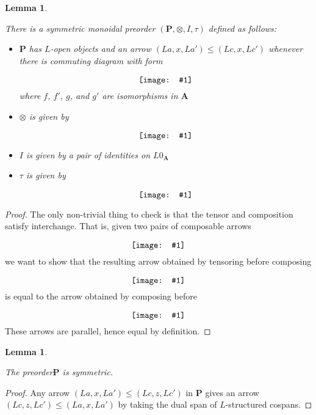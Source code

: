 \documentclass{amsart}
\newcommand{\A}{\cat{A}}
\renewcommand{\P}{\cat{P}}
\newcommand{\cat}[1]{\mathbf{#1}}
\newcommand{\diagram}[1]{\raisebox{-0.5\height}{\texttt{[image: \#1]}}}
\newtheorem{lemma}[theorem]{Lemma}
\theoremstyle{remark}
\theoremstyle{definition}
\begin{document}
\begin{lemma}
  \label{thm:dlb-rewr-arrcat}

  There is a symmetric monoidal preorder
  $ (\P , \otimes , I , \tau ) $ defined as follows:
  
  \begin{itemize}
  \item $ \P $ has $ L $-open objects and an arrow
    $ ( La , x , La') \leq ( Lc , x , Lc') $ whenever
    there is commuting diagram with form
    \[
      \diagram{diag_nlr_dbl-rewrite-2cell}
    \]
    where $ f $, $ f' $, $ g $, and $ g' $ are isomorphisms in $ \A $
   \item $ \otimes $ is given by
       \[
         \diagram{diag_nlr_dbl-rewrite-tensor}
       \]
   \item $ I $ is given by a pair of identities on $ L0_{\A} $
   \item $ \tau $ is given by
     \[
	\diagram{diag_nlr_dbl-rewrite-braiding}
     \]
   \end{itemize}
    
\end{lemma}
  
\begin{proof}
  
  The only non-trivial thing to check is that the tensor and
  composition satisfy interchange. That is, given two pairs of
  composable arrows
  \[
    \diagram{diag_nlr_preorder-interchange}
  \]
  we want to show that the resulting arrow obtained by tensoring before composing
  \[
    \diagram{diag_nlr_preorder-tensor-compose}
  \]
  is equal to the arrow obtained by composing before
  \[
    \diagram{diag_nlr_preorder-compose-tensor}
  \]
  These arrows are parallel, hence equal by definition.
  
\end{proof}

\begin{lemma}
  \label{thm:preord-symm}
  
  The preorder$ \P $ is symmetric.
  
\end{lemma}

\begin{proof}
  
  Any arrow $ ( La , x , La' ) \leq ( Lc , z , Lc' ) $ in
  $ \P $ gives an arrow
  $ ( Lc , z , Lc' ) \leq ( La , x , La' ) $ by taking the
  dual span of $ L $-structured cospans.
  
\end{proof}
\end{document}
